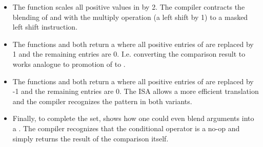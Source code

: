 \begin{itemize}
  \item The function  scales all positive values in  by 2.
    The compiler contracts the blending of  and  with the
    multiply operation (a left shift by 1) to a masked left shift instruction.

  \item The functions  and  both return a 
    where all positive entries of  are replaced by 1 and the remaining
    entries are 0.
    I.e. converting the comparison result to  works analogue to
    promotion of \bool to \intt.

  \item The functions  and  both return a 
    where all positive entries of  are replaced by -1 and the remaining
    entries are 0.
    The ISA allows a more efficient translation and the compiler recognizes the
    pattern in both variants.

  \item Finally, to complete the set,  shows how one could even blend
     arguments into a .
    The compiler recognizes that the conditional operator is a no-op and simply
    returns the result of the comparison itself.
\end{itemize}

